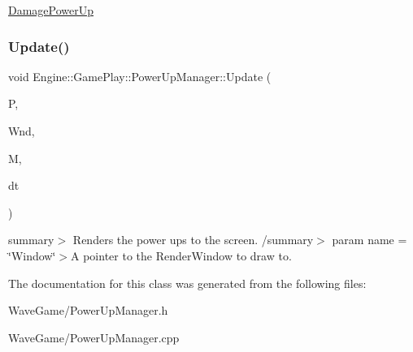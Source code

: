 \hyperlink{class_engine_1_1_game_play_1_1_damage_power_up}{Damage\+Power\+Up} \mbox{\label{class_engine_1_1_game_play_1_1_power_up_manager_a7c64c6a0d310ae2662327bac1f602bec}} 
\subsubsection{\texorpdfstring{Update()}{Update()}}
{\footnotesize\ttfamily void Engine\+::\+Game\+Play\+::\+Power\+Up\+Manager\+::\+Update (\begin{DoxyParamCaption}\item[{\hyperlink{class_engine_1_1_game_play_1_1_player}{Player} $\ast$}]{P,  }\item[{Render\+Window $\ast$}]{Wnd,  }\item[{\hyperlink{class_engine_1_1_core_1_1_map}{Map}}]{M,  }\item[{float}]{dt }\end{DoxyParamCaption})}

summary$>$ Renders the power ups to the screen. /summary$>$ param name = \char`\"{}\+Window\char`\"{}$>$A pointer to the Render\+Window to draw to.

The documentation for this class was generated from the following files\+:\begin{DoxyCompactItemize}
\item 
Wave\+Game/Power\+Up\+Manager.\+h\item 
Wave\+Game/Power\+Up\+Manager.\+cpp\end{DoxyCompactItemize}
